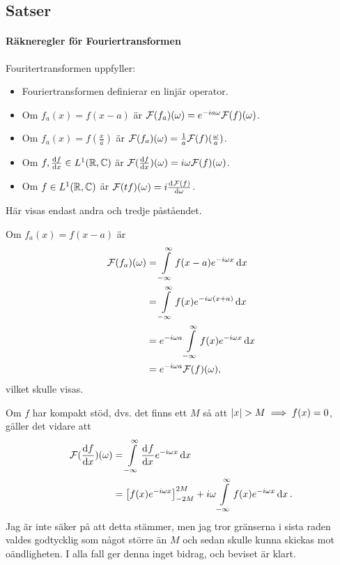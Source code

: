 \subsection{Satser}

\paragraph{Räkneregler för Fouriertransformen}
Fouritertransformen uppfyller:
\begin{itemize}
	\item Fouriertransformen definierar en linjär operator.
	\item Om $f_{a}(x) = f(x - a)$ är $\mathcal{F}(f_{a})(\omega) = e^{-ia\omega}\mathcal{F}(f)(\omega)$.
	\item Om $f_{a}(x) = f(\frac{x}{a})$ är $\mathcal{F}(f_{a})(\omega) = \frac{1}{a}\mathcal{F}(f)(\frac{\omega}{a})$.
	\item Om $f,\dv{f}{x}\in L^{1}(\mathbb{R}, \mathbb{C})$ är $\mathcal{F}(\dv{f}{x})(\omega) = i\omega\mathcal{F}(f)(\omega)$.
	\item Om $f\in L^{1}(\mathbb{R}, \mathbb{C})$ är $\mathcal{F}(tf)(\omega) = i\dv[]{\mathcal{F}(f)}{\omega} (\omega)$.
\end{itemize}

\proof
Här visas endast andra och tredje påståendet.

Om $f_{a}(x) = f(x - a)$ är 
\begin{align*}
	\mathcal{F}(f_{a})(\omega) &= \int\limits_{-\infty}^{\infty}f(x - a)e^{-i\omega x}\dd{x} \\
	                    &= \int\limits_{-\infty}^{\infty}f(x)e^{-i\omega(x + a)}\dd{x} \\
	                    &= e^{-i\omega a}\int\limits_{-\infty}^{\infty}f(x)e^{-i\omega x}\dd{x} \\
	                    &= e^{-i\omega a}\mathcal{F}(f)(\omega),
\end{align*}
vilket skulle visas.

Om $f$ har kompakt stöd, dvs. det finns ett $M$ så att $\abs{x} > M\implies f(x) = 0$,  gäller det vidare att
\begin{align*}
	\mathcal{F}(\dv{f}{x})(\omega) &= \int\limits_{-\infty}^{\infty}\dv[]{f}{x} (x)e^{-i\omega x}\dd{x} \\
	                        &= \left[f(x)e^{-i\omega x}\right]_{-2M}^{2M} + i\omega\int\limits_{-\infty}^{\infty}f(x)e^{-i\omega x}\dd{x}.
\end{align*}
Jag är inte säker på att detta stämmer, men jag tror gränserna i sista raden valdes godtycklig som något större än $M$ och sedan skulle kunna skickas mot oändligheten. I alla fall ger denna inget bidrag, och beviset är klart.

